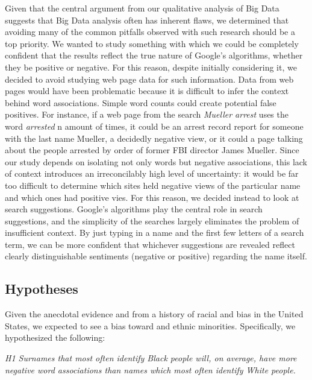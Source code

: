 \documentclass[sigconf]{acmart}
\begin{document}
Given that the central argument from our qualitative analysis of Big Data suggests that Big Data analysis often has inherent flaws, we determined that avoiding many of the common pitfalls observed with such research should be a top priority. We wanted to study something with which we could be completely confident that the results reflect the true nature of Google's algorithms, whether they be positive or negative. For this reason, despite initially considering it, we decided to avoid studying web page data for such information. Data from web pages would have been problematic because it is difficult to infer the context behind word associations. Simple word counts could create potential false positives. For instance, if a web page from the search {\em Mueller arrest} uses the word {\em arrested} n amount of times, it could be an arrest record report for someone with the last name Mueller, a decidedly negative view, or it could a page talking about the people arrested by order of former FBI director James Mueller. Since our study depends on isolating not only words but negative associations, this lack of context introduces an irreconcilably high level of uncertainty: it would be far too difficult to determine which sites held negative views of the particular name and which ones had positive vies. For this reason, we decided instead to look at search suggestions. Google's algorithms play the central role in search suggestions, and the simplicity of the searches largely eliminates the problem of insufficient context. By just typing in a name and the first few letters of a search term, we can be more confident that whichever suggestions are revealed reflect clearly distinguishable sentiments (negative or positive) regarding the name itself.

\subsection{Hypotheses}

Given the anecdotal evidence and from a history of racial and bias in the United States, we expected to see a bias toward and ethnic minorities. Specifically, we hypothesized the following: \\

\vspace{2mm}

{\em H1 Surnames that most often identify Black people will, on average, have more negative word associations than names which most often identify White people.} \\
\end{document}
